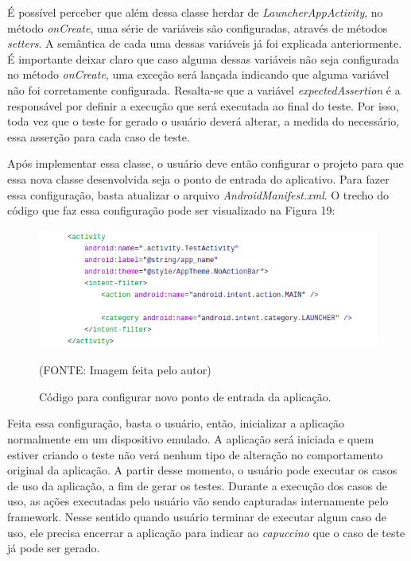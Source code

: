 \documentclass[
    12pt,       %
    openright,      %
    twoside,      %
    a4paper,      %
    english,      %
    french,       %
    spanish,      %
    brazil,       %
    ]{abntex2}
\begin{document}
        É possível perceber que além dessa classe herdar de \textit{LauncherAppActivity}, no método
        \textit{onCreate}, uma série de variáveis são configuradas, através de métodos \textit{setters}.
        A semântica de cada uma dessas variáveis já foi explicada anteriormente. É importante deixar
        claro que caso alguma dessas variáveis não seja configurada no método \textit{onCreate}, uma exceção
        será lançada indicando que alguma variável não foi corretamente configurada. Resalta-se que a
        variável \textit{expectedAssertion} é a responsável por definir a execução que será executada
        ao final do teste. Por isso, toda vez que o teste for gerado o usuário deverá alterar, a medida
        do necessário, essa asserção para cada caso de teste.

        Após implementar essa classe, o usuário deve então configurar o projeto para que essa nova classe
        desenvolvida seja o ponto de entrada do aplicativo. Para fazer essa configuração, basta atualizar
        o arquivo \textit{AndroidManifest.xml}. O trecho do código que faz essa configuração pode ser
        visualizado na Figura 19:

        \begin{figure}[htbp]
          \begin{center}
            \includegraphics[width=1.0\textwidth]{img/androidManifest.png}
              \end{center}
            \caption{\label{fig:passaro} Código para configurar novo ponto de entrada da aplicação.}
          \begin{center}(FONTE: Imagem feita pelo autor)\end{center}
        \end{figure}

        Feita essa configuração, basta o usuário, então, inicializar a aplicação normalmente em um dispositivo
        emulado. A aplicação será iniciada e quem estiver criando o teste não verá nenhum tipo de alteração
        no comportamento original da aplicação. A partir desse momento, o usuário pode executar os casos de
        uso da aplicação, a fim de gerar os testes. Durante a execução dos casos de uso, as ações executadas
        pelo usuário vão sendo capturadas internamente pelo framework. Nesse sentido quando usuário terminar
        de executar algum caso de uso, ele precisa encerrar a aplicação para indicar ao \textit{capuccino}
        que o caso de teste já pode ser gerado.
\end{document}
